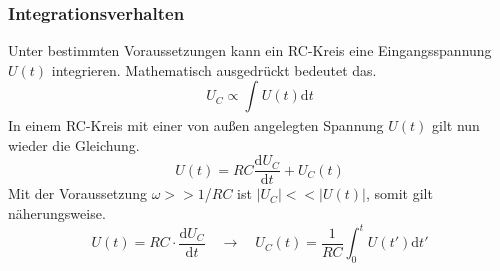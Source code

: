 \subsubsection{Integrationsverhalten}
Unter bestimmten Voraussetzungen kann ein RC-Kreis eine Eingangsspannung $U(t)$ integrieren. Mathematisch ausgedrückt bedeutet das.
\begin{equation*}
U_{C} \propto \int_{}^{} U(t) \text{d}t
\end{equation*}
In einem RC-Kreis mit einer von außen angelegten Spannung $U(t)$ gilt nun wieder die Gleichung.
\begin{equation*}
U(t) = RC \frac{\text{d}U_{C}}{\text{d}t} + U_{C}(t)
\end{equation*}
Mit der Voraussetzung $\omega >> 1$/$RC$ ist $|U_{C}| << |U(t)|$, somit gilt näherungsweise.
\begin{equation*}
U(t) = RC \cdot \frac{\text{d}U_{C}}{\text{d}t} \quad \to \quad U_{C}(t) = \frac{1}{RC} \int_{0}^{t}U(t') \text{d}t'
\end{equation*}